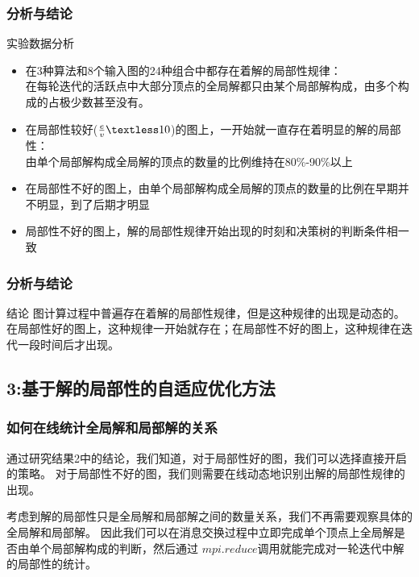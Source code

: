 \documentclass[10pt]{beamer}
\begin{document}
\begin{frame}%
  \frametitle{分析与结论}
  \begin{block}
    {实验数据分析}
    \begin{itemize}
      \item 在3种算法和8个输入图的24种组合中都存在着解的局部性规律：\\
      在每轮迭代的活跃点中大部分顶点的全局解都只由某个局部解构成，由多个构成的占极少数甚至没有。
      \item 在局部性较好($\frac{e}{v} \textless 10$)的图上，一开始就一直存在着明显的解的局部性：\\
      由单个局部解构成全局解的顶点的数量的比例维持在80\%-90\%以上
      \item 在局部性不好的图上，由单个局部解构成全局解的顶点的数量的比例在早期并不明显，到了后期才明显
      \item 局部性不好的图上，解的局部性规律开始出现的时刻和决策树的判断条件相一致
    \end{itemize}
  \end{block}
\end{frame}



\begin{frame}%
  \frametitle{分析与结论}
  \begin{block}
    {结论}
    图计算过程中普遍存在着解的局部性规律，但是这种规律的出现是动态的。\\
    在局部性好的图上，这种规律一开始就存在；在局部性不好的图上，这种规律在迭代一段时间后才出现。
  \end{block}
\end{frame}


\subsection{3:基于解的局部性的自适应优化方法}

\begin{frame}%
  \frametitle{如何在线统计全局解和局部解的关系}
  \begin{block}
    {}
    通过研究结果2中的结论，我们知道，对于局部性好的图，我们可以选择直接开启的策略。
    对于局部性不好的图，我们则需要在线动态地识别出解的局部性规律的出现。

    \vspace{1em}

    考虑到解的局部性只是全局解和局部解之间的数量关系，我们不再需要观察具体的全局解和局部解。
    因此我们可以在消息交换过程中立即完成单个顶点上全局解是否由单个局部解构成的判断，然后通过
    $mpi.reduce$调用就能完成对一轮迭代中解的局部性的统计。
  \end{block}
\end{frame}
\end{document}

